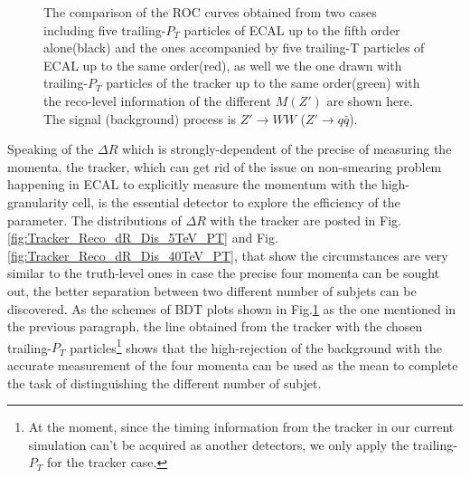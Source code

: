 \begin{figure}
\begin{center}
\end{center}
\caption{The comparison of the ROC curves obtained from two cases including five trailing-$P_{T}$ particles of ECAL up to the fifth order alone(black) and the ones accompanied by five trailing-T particles of ECAL up to the same order(red), as well we the one drawn with trailing-$P_{T}$ particles of the tracker up to the same order(green) with the reco-level information of the different $M(Z')$ are shown here. The signal (background) process is $Z'\rightarrow WW$ ($Z' \rightarrow q\bar{q}$). \label{fig:Reco_dR_BDT}}
\end{figure}

Speaking of the $\Delta R$ which is strongly-dependent of the precise of measuring the momenta, the tracker, which can get rid of the issue on non-smearing problem happening in ECAL to explicitly measure the momentum with the high-granularity cell, is the essential detector to explore the efficiency of the parameter. The distributions of $\Delta R$ with the tracker are posted in Fig.\ref{fig:Tracker_Reco_dR_Dis_5TeV_PT} and Fig.\ref{fig:Tracker_Reco_dR_Dis_40TeV_PT}, that show the circumstances are very similar to the truth-level ones in case the precise four momenta can be sought out, the better separation between two different number of subjets can be discovered. As the schemes of BDT plots shown in Fig.\ref{fig:Reco_dR_BDT} as the one mentioned in the previous paragraph, the line obtained from the tracker with the chosen trailing-$P_{T}$ particles\footnote{At the moment, since the timing information from the tracker in our current simulation can't be acquired as another detectors, we only apply the trailing-$P_{T}$ for the tracker case.} shows that the high-rejection of the background with the accurate measurement of the four momenta can be used as the mean to complete the task of distinguishing the different number of subjet. \\

